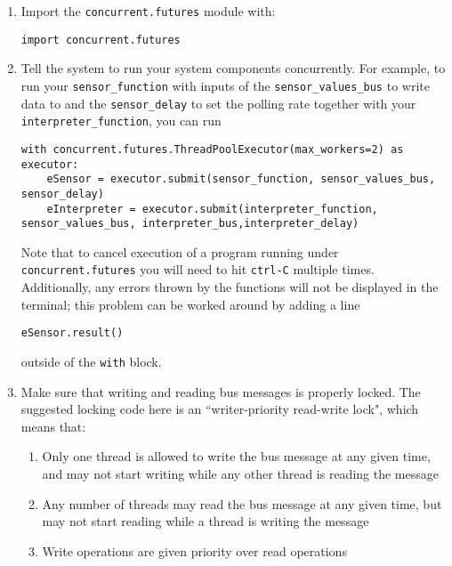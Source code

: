 \documentclass[11pt]{article}
\begin{document}
\begin{enumerate}
\item Import the \verb#concurrent.futures# module with:
\begin{lstlisting}
import concurrent.futures
\end{lstlisting}
\item Tell the system to run your system components concurrently. For example, to run your \verb#sensor_function# with inputs of the \verb#sensor_values_bus# to write data to and the \verb#sensor_delay# to set the polling rate together with your \verb#interpreter_function#, you can run
\begin{lstlisting}
with concurrent.futures.ThreadPoolExecutor(max_workers=2) as executor:
	eSensor = executor.submit(sensor_function, sensor_values_bus, sensor_delay)
	eInterpreter = executor.submit(interpreter_function, sensor_values_bus, interpreter_bus,interpreter_delay)
\end{lstlisting}
Note that to cancel execution of a program running under \verb#concurrent.futures# you will need to hit \verb#ctrl-C# multiple times. Additionally, any errors thrown by the functions will not be displayed in the terminal; this problem can be worked around by adding a line
\begin{lstlisting}
eSensor.result()
\end{lstlisting} 
outside of the \verb#with# block.
\item Make sure that writing and reading bus messages is properly locked. The suggested locking code here is an ``writer-priority read-write lock", which means that:
\begin{enumerate}
\item Only one thread is allowed to write the bus message at any given time, and may not start writing while any other thread is reading the message
\item Any number of threads may read the bus message at any given time, but may not start reading while a thread is writing the message
\item Write operations are given priority over read operations

\end{enumerate}
\end{enumerate}
\end{document}
